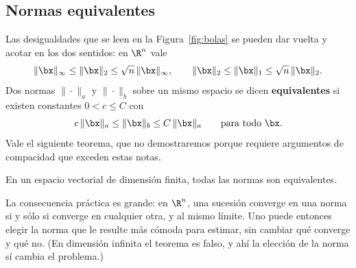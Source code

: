 \subsection{Normas equivalentes}

Las desigualdades que se leen en la Figura~\ref{fig:bolas} se pueden dar
vuelta y acotar en los dos sentidos: en $\R^n$ vale
\[
\|\bx\|_\infty\le\|\bx\|_2\le\sqrt n\,\|\bx\|_\infty,
\qquad
\|\bx\|_2\le\|\bx\|_1\le\sqrt n\,\|\bx\|_2 .
\]
Dos normas $\|\cdot\|_a$ y $\|\cdot\|_b$ sobre un mismo espacio se dicen
\textbf{equivalentes} si existen constantes $0<c\le C$ con
\[
c\,\|\bx\|_a\le\|\bx\|_b\le C\,\|\bx\|_a \qquad\text{para todo }\bx .
\]
Vale el siguiente teorema, que no demostraremos porque requiere argumentos de
compacidad que exceden estas notas.

\begin{theorem}\label{teo:equivalencia}
En un espacio vectorial de dimensión finita, todas las normas son
equivalentes.
\end{theorem}

La consecuencia práctica es grande: en $\R^n$, una sucesión converge en una
norma si y sólo si converge en cualquier otra, y al mismo límite. Uno puede
entonces elegir la norma que le resulte más cómoda para estimar, sin cambiar
qué converge y qué no. (En dimensión infinita el teorema es falso, y ahí la
elección de la norma sí cambia el problema.)

